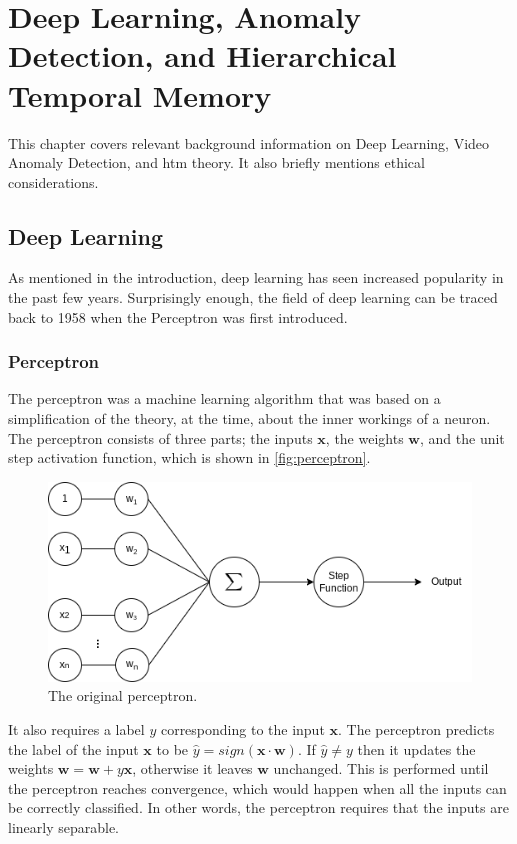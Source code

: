 \chapter{Deep Learning, Anomaly Detection, and Hierarchical Temporal Memory}
\label{sec:background}
This chapter covers relevant background information on Deep Learning, Video Anomaly Detection, and \gls*{htm} theory. It also briefly mentions ethical considerations.
\section{Deep Learning}
As mentioned in the introduction, deep learning has seen increased popularity in the past few years. Surprisingly enough, the field of deep learning can be traced back to 1958 when the Perceptron\cite{perceptron,perceptron2} was first introduced.
\subsection{Perceptron}
The perceptron\cite{perceptron, perceptron2} was a machine learning algorithm that was based on a simplification of the theory, at the time, about the inner workings of a neuron. The perceptron consists of three parts; the inputs $\mathbf{x}$, the weights $\mathbf{w}$, and the unit step activation function, which is shown in \autoref{fig:perceptron}.
\begin{figure}[H]
    \centering
    \includegraphics[width=\linewidth]{resources/related_works/perceptron}
    \caption[The Original Perceptron]{The original perceptron.}
    \label{fig:perceptron}
\end{figure}
It also requires a label $y$ corresponding to the input $\mathbf{x}$. The perceptron predicts the label of the input $\mathbf{x}$ to be $\hat{y}=sign(\mathbf{x}\cdot\mathbf{w})$. If $\hat{y}\neq y$ then it updates the weights $\mathbf{w}=\mathbf{w}+y\mathbf{x}$, otherwise it leaves $\mathbf{w}$ unchanged. This is performed until the perceptron reaches convergence, which would happen when all the inputs can be correctly classified. In other words, the perceptron requires that the inputs are linearly separable.
